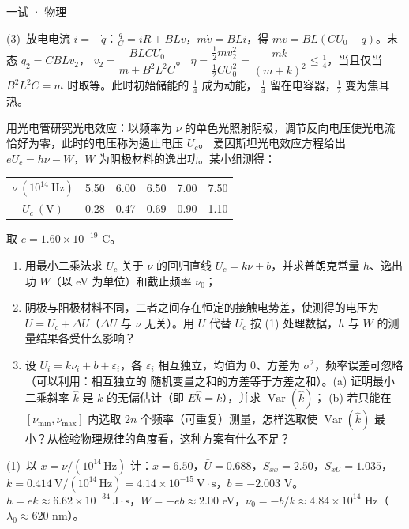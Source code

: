 \documentclass[cjk=noto, seal=first]{mojing-exam}
\begin{document}
\begin{paper}[time={建议 2 小时（训练设置）}, full=100]{一试 · 物理}
\begin{questions}
\begin{solution}
(3)~放电电流 $i=-\dot q$：$\frac qC=iR+BLv$，$m\dot v=BLi$，得 $mv=BL(CU_0-q)$。末态 $q_2=CBLv_2$，
$v_2=\dfrac{BLCU_0}{m+B^2L^2C}$。
$\eta=\dfrac{\frac12mv_2^2}{\frac12CU_0^2}=\dfrac{mk}{(m+k)^2}\le\frac14$，当且仅当 $B^2L^2C=m$ 时取等。此时初始储能的 $\frac14$ 成为动能，
$\frac14$ 留在电容器，$\frac12$ 变为焦耳热。
\end{solution}

\question[20]
用光电管研究光电效应：以频率为 $\nu$ 的单色光照射阴极，调节反向电压使光电流恰好为零，此时的电压称为遏止电压 $U_c$。
爱因斯坦光电效应方程给出 $eU_c=h\nu-W$，$W$ 为阴极材料的逸出功。某小组测得：
\begin{center}
\begin{tabular}{c|ccccc}
  \toprule
  $\nu\ (10^{14}\ \mathrm{Hz})$ & 5.50 & 6.00 & 6.50 & 7.00 & 7.50 \\
  $U_c\ (\mathrm V)$ & 0.28 & 0.47 & 0.69 & 0.90 & 1.10 \\
  \bottomrule
\end{tabular}
\end{center}
取 $e=1.60\times10^{-19}$ C。
\begin{enumerate}
  \item 用最小二乘法求 $U_c$ 关于 $\nu$ 的回归直线 $U_c=k\nu+b$，并求普朗克常量 $h$、逸出功 $W$（以 eV 为单位）和截止频率 $\nu_0$；
  \item 阴极与阳极材料不同，二者之间存在恒定的接触电势差，使测得的电压为 $U=U_c+\Delta U$（$\Delta U$ 与 $\nu$ 无关）。用 $U$ 代替 $U_c$
        按 (1) 处理数据，$h$ 与 $W$ 的测量结果各受什么影响？
  \item 设 $U_i=k\nu_i+b+\varepsilon_i$，各 $\varepsilon_i$ 相互独立，均值为 $0$、方差为 $\sigma^2$，频率误差可忽略（可以利用：相互独立的
        随机变量之和的方差等于方差之和）。(a) 证明最小二乘斜率 $\hat k$ 是 $k$ 的无偏估计（即 $E\hat k=k$），并求 $\operatorname{Var}(\hat k)$；
        (b) 若只能在 $[\nu_{\min},\nu_{\max}]$ 内选取 $2n$ 个频率（可重复）测量，怎样选取使 $\operatorname{Var}(\hat k)$ 最小？从检验物理规律的角度看，这种方案有什么不足？
\end{enumerate}
\answerspace{2cm}
\begin{solution}
(1)~以 $x=\nu/(10^{14}\,\mathrm{Hz})$ 计：$\bar x=6.50$，$\bar U=0.688$，$S_{xx}=2.50$，$S_{xU}=1.035$，$k=0.414\ \mathrm V/(10^{14}\,\mathrm{Hz})
=4.14\times10^{-15}\ \mathrm{V\cdot s}$，$b=-2.003$ V。
$h=ek\approx6.62\times10^{-34}\ \mathrm{J\cdot s}$，$W=-eb\approx2.00$ eV，$\nu_0=-b/k\approx4.84\times10^{14}$ Hz（$\lambda_0\approx620$ nm）。


\end{solution}
\end{questions}
\end{paper}
\end{document}
